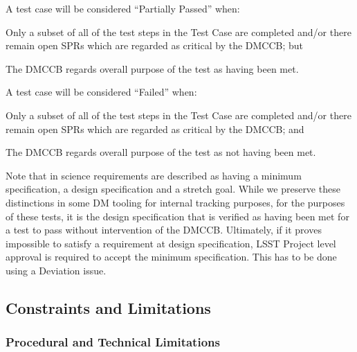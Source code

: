 A test case will be considered ``Partially Passed'' when:

\begin{itemize_single}
\item{Only a subset of all of the test steps in the Test Case are completed and/or there remain open SPRs which are regarded as critical by the DMCCB; but}
\item{The DMCCB regards overall purpose of the test as having been met.}
\end{itemize_single}

A test case will be considered ``Failed'' when:

\begin{itemize_single}
\item{Only a subset of all of the test steps in the Test Case are completed and/or there remain open SPRs which are regarded as critical by the DMCCB; and}
\item{The DMCCB regards overall purpose of the test as not having been met.}
\end{itemize_single}

Note that in  science requirements are described as having a minimum specification, a design specification and a stretch goal.
While we preserve these distinctions in some DM tooling for internal tracking purposes, for the purposes of these tests, it is the design specification that is verified as having been met for a test to pass without intervention of the DMCCB.
Ultimately, if it proves impossible to satisfy a requirement at design specification, LSST Project level approval is required to accept the minimum specification.
This has to be done using a Deviation issue.

\subsection{Constraints and Limitations}

\subsubsection{Procedural and Technical Limitations}

